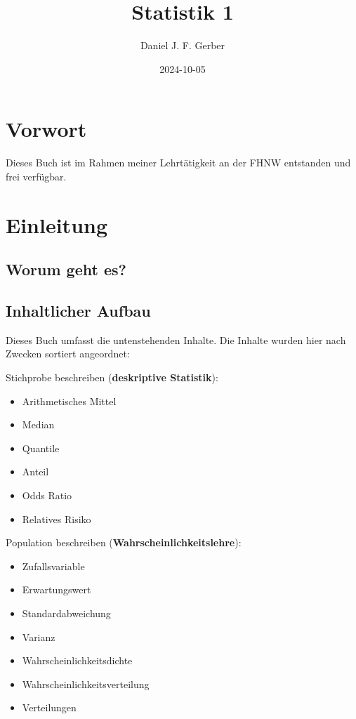 \documentclass[
]{book}
\title{Statistik 1}
\author{Daniel J. F. Gerber}
\date{2024-10-05}
\providecommand{\tightlist}{%
  \setlength{\itemsep}{0pt}\setlength{\parskip}{0pt}}
\theoremstyle{definition}
\theoremstyle{definition}
\theoremstyle{definition}
\theoremstyle{definition}
\theoremstyle{remark}
\begin{document}
\maketitle

{
\setcounter{tocdepth}{1}
\tableofcontents
}
\chapter*{Vorwort}\label{vorwort}

Dieses Buch ist im Rahmen meiner Lehrtätigkeit an der FHNW entstanden und frei verfügbar.

\chapter{Einleitung}\label{einleitung}

\section{Worum geht es?}\label{worum-geht-es}

\section{Inhaltlicher Aufbau}\label{inhaltlicher-aufbau}

Dieses Buch umfasst die untenstehenden Inhalte. Die Inhalte wurden hier nach Zwecken sortiert angeordnet:

Stichprobe beschreiben (\textbf{deskriptive Statistik}):

\begin{itemize}
\tightlist
\item
  Arithmetisches Mittel
\item
  Median
\item
  Quantile
\item
  Anteil
\item
  Odds Ratio
\item
  Relatives Risiko
\end{itemize}

Population beschreiben (\textbf{Wahrscheinlichkeitslehre}):

\begin{itemize}
\tightlist
\item
  Zufallsvariable
\item
  Erwartungswert
\item
  Standardabweichung
\item
  Varianz
\item
  Wahrscheinlichkeitsdichte
\item
  Wahrscheinlichkeitsverteilung
\item
  Verteilungen
\end{itemize}
\end{document}
